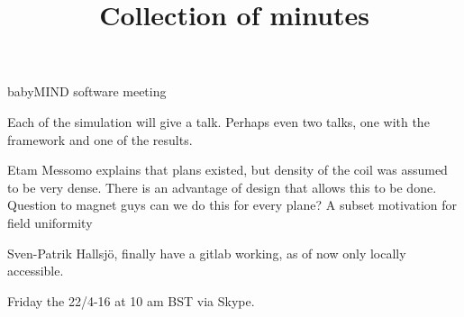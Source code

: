 \documentclass{article}
\title{Collection of minutes}
\author{\LaTeXe}
\begin{document}
\begin{Minutes}{babyMIND software meeting}

\maketitle

Each of the simulation will give a talk. Perhaps even two talks, one with the framework and one of the results.

Etam Messomo explains that plans existed, but density of the coil was assumed to be very dense.
There is an advantage of design that allows this to be done.
Question to magnet guys can we do this for every plane? A subset motivation for field uniformity


Sven-Patrik Hallsj\"o, finally have a gitlab working, as of now only locally accessible.

Friday the 22/4-16 at 10 am BST via Skype.

\end{Minutes}
\end{document}
